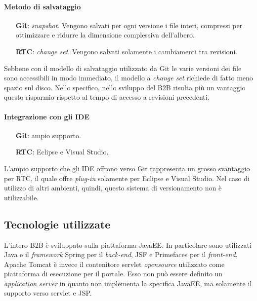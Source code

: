 \paragraph*{Metodo di salvataggio}
\begin{itemize}
	\item[\textbf{Git}:] \textit{snapshot}. Vengono salvati per ogni versione i file interi, compressi per ottimizzare e ridurre la dimensione complessiva dell'albero.
	\item[\textbf{RTC}:] \textit{change set}. Vengono salvati solamente i cambiamenti tra revisioni.
\end{itemize}
Sebbene con il modello di salvataggio utilizzato da Git le varie versioni dei file sono accessibili in modo immediato, il modello a \textit{change set} richiede di fatto meno spazio sul disco. Nello specifico, nello sviluppo del B2B risulta più un vantaggio questo risparmio rispetto al tempo di accesso a revisioni precedenti. 

\paragraph*{Integrazione con gli IDE}
\begin{itemize}
	\item[\textbf{Git}:] ampio supporto. 
	\item[\textbf{RTC}:] Eclipse e Visual Studio.
\end{itemize}
L'ampio supporto che gli IDE offrono verso Git rappresenta un grosso svantaggio per RTC, il quale offre \textit{plug-in} solamente per Eclipse e Visual Studio. Nel caso di utilizzo di altri ambienti, quindi, questo sistema di versionamento non è utilizzabile.

\subsection{Tecnologie utilizzate}
L'intero B2B è sviluppato sulla piattaforma \Gls{JavaEE}. In particolare sono utilizzati Java e il \textit{framework} Spring per il \textit{back-end}, JSF e Primefaces per il \textit{front-end}. Apache Tomcat è invece il contenitore \gls{servlet} \textit{opensource} utilizzato come piattaforma di esecuzione per il portale. Esso non può essere definito un \textit{application server} in quanto non implementa la specifica JavaEE, ma solamente il supporto verso servlet e \Gls{JSP}.

